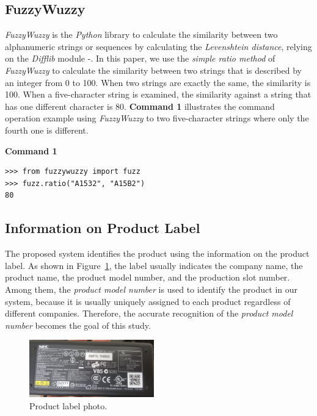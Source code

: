 \documentclass[technicalreport]{ieicej}
\begin{document}
    \subsection{FuzzyWuzzy}
        {\em FuzzyWuzzy} is the {\em Python} library to calculate the similarity between two alphanumeric strings or sequences by calculating the {\em Levenshtein distance}, relying on the {\em Difflib} module \cite{fuzzywuzzy}-\cite{fuzzywuzzy-git}. In this paper, we use the {\em simple ratio method} of {\em FuzzyWuzzy} to calculate the similarity between two strings that is described by an integer from 0 to 100. When two strings are exactly the same, the similarity is 100. When a five-character string is examined, the similarity against a string that has one different character is $80$. {\bf Command 1} illustrates the command operation example using {\em FuzzyWuzzy} to two five-character strings where only the fourth one is different.
     
        \begin{center}\bf Command 1\end{center}
        \begin{lstlisting}
>>> from fuzzywuzzy import fuzz
>>> fuzz.ratio("A1532", "A15B2")
80      \end{lstlisting}

    \subsection{Information on Product Label}
        The proposed system identifies the product using the information on the product label. As shown in Figure~\ref{fig:label-regex-samp}, the label usually indicates the company name, the product name, the product model number, and the production slot number. Among them, the {\em product model number} is used to identify the product in our system, because it is usually uniquely assigned to each product regardless of different companies. Therefore, the accurate recognition of the {\em product model number} becomes the goal of this study.

        \begin{figure}[t] 
            \begin{center}
            \includegraphics[width=0.48\textwidth]{figure/label-regex-samp.png}
            \end{center}
            \caption{Product label photo.}
            \label{fig:label-regex-samp}
        \end{figure}
\end{document}
